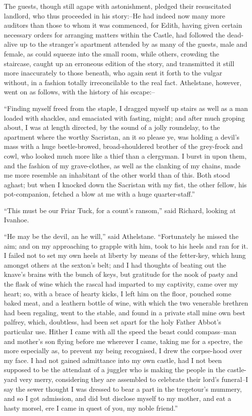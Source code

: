 The guests, though still agape with astonishment, pledged their
resuscitated landlord, who thus proceeded in his story:--He had indeed
now many more auditors than those to whom it was commenced, for Edith,
having given certain necessary orders for arranging matters within the
Castle, had followed the dead-alive up to the stranger's apartment
attended by as many of the guests, male and female, as could squeeze
into the small room, while others, crowding the staircase, caught up an
erroneous edition of the story, and transmitted it still more
inaccurately to those beneath, who again sent it forth to the vulgar
without, in a fashion totally irreconcilable to the real fact.
Athelstane, however, went on as follows, with the history of his
escape:--

``Finding myself freed from the staple, I dragged myself up stairs as
well as a man loaded with shackles, and emaciated with fasting, might;
and after much groping about, I was at length directed, by the sound of
a jolly roundelay, to the apartment where the worthy Sacristan, an it so
please ye, was holding a devil's mass with a huge beetle-browed,
broad-shouldered brother of the grey-frock and cowl, who looked much
more like a thief than a clergyman. I burst in upon them, and the
fashion of my grave-clothes, as well as the clanking of my chains, made
me more resemble an inhabitant of the other world than of this. Both
stood aghast; but when I knocked down the Sacristan with my fist, the
other fellow, his pot-companion, fetched a blow at me with a huge
quarter-staff.''

``This must be our Friar Tuck, for a count's ransom,'' said Richard,
looking at Ivanhoe.

``He may be the devil, an he will,'' said Athelstane. ``Fortunately he
missed the aim; and on my approaching to grapple with him, took to his
heels and ran for it. I failed not to set my own heels at liberty by
means of the fetter-key, which hung amongst others at the sexton's belt;
and I had thoughts of beating out the knave's brains with the bunch of
keys, but gratitude for the nook of pasty and the flask of wine which
the rascal had imparted to my captivity, came over my heart; so, with a
brace of hearty kicks, I left him on the floor, pouched some baked meat,
and a leathern bottle of wine, with which the two venerable brethren had
been regaling, went to the stable, and found in a private stall mine own
best palfrey, which, doubtless, had been set apart for the holy Father
Abbot's particular use. Hither I came with all the speed the beast could
compass--man and mother's son flying before me wherever I came, taking
me for a spectre, the more especially as, to prevent my being
recognised, I drew the corpse-hood over my face. I had not gained
admittance into my own castle, had I not been supposed to be the
attendant of a juggler who is making the people in the castle-yard very
merry, considering they are assembled to celebrate their lord's
funeral--I say the sewer thought I was dressed to bear a part in the
tregetour's mummery, and so I got admission, and did but disclose myself
to my mother, and eat a hasty morsel, ere I came in quest of you, my
noble friend.''

